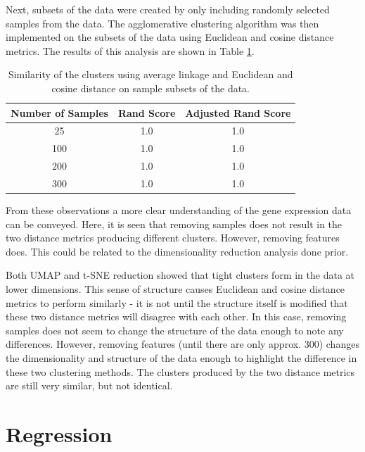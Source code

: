 \documentclass[12pt]{article}
\begin{document}
Next, subsets of the data were created by only including randomly selected samples from the data. The agglomerative clustering algorithm was then implemented on the subsets of the data using Euclidean and cosine distance metrics. The results of this analysis are shown in Table \ref{tab:agglo_euc_sub2}.

\begin{table}[H]
    \centering
    \begin{tabular}{|c|c|c|} 
        \hline
        \textbf{Number of Samples} & \textbf{Rand Score} & \textbf{Adjusted Rand Score} \\
        \hline
        25 & 1.0 & 1.0 \\
        100 & 1.0 & 1.0 \\
        200 & 1.0 & 1.0 \\
        300 & 1.0 & 1.0 \\
        \hline
    \end{tabular}
    \caption{Similarity of the clusters using average linkage and Euclidean and cosine distance on sample subsets of the data.}
    \label{tab:agglo_euc_sub2}
\end{table}

\vspace{-0.5cm}

From these observations a more clear understanding of the gene expression data can be conveyed. Here, it is seen that removing samples does not result in the two distance metrics producing different clusters. However, removing features does. This could be related to the dimensionality reduction analysis done prior. 

Both UMAP and t-SNE reduction showed that tight clusters form in the data at lower dimensions. This sense of structure causes Euclidean and cosine distance metrics to perform similarly - it is not until the structure itself is modified that these two distance metrics will disagree with each other. In this case, removing samples does not seem to change the structure of the data enough to note any differences. However, removing features (until there are only approx. 300) changes the dimensionality and structure of the data enough to highlight the difference in these two clustering methods. The clusters produced by the two distance metrics are still very similar, but not identical.

\section{Regression}
\end{document}
